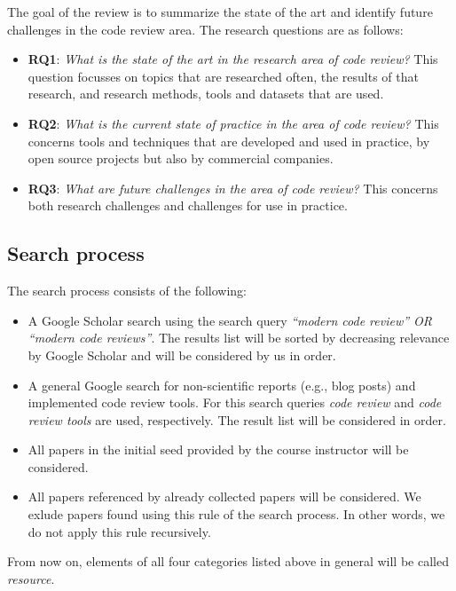 \documentclass[]{book}
\providecommand{\tightlist}{%
  \setlength{\itemsep}{0pt}\setlength{\parskip}{0pt}}
\begin{document}
The goal of the review is to summarize the state of the art and identify
future challenges in the code review area. The research questions are as
follows:

\begin{itemize}
\tightlist
\item
  \textbf{RQ1}: \emph{What is the state of the art in the research area
  of code review?} This question focusses on topics that are researched
  often, the results of that research, and research methods, tools and
  datasets that are used.
\item
  \textbf{RQ2}: \emph{What is the current state of practice in the area
  of code review?} This concerns tools and techniques that are developed
  and used in practice, by open source projects but also by commercial
  companies.
\item
  \textbf{RQ3}: \emph{What are future challenges in the area of code
  review?} This concerns both research challenges and challenges for use
  in practice.
\end{itemize}

\subsection{Search process}\label{search-process}

The search process consists of the following:

\begin{itemize}
\tightlist
\item
  A Google Scholar search using the search query \emph{``modern code
  review'' OR ``modern code reviews''}. The results list will be sorted
  by decreasing relevance by Google Scholar and will be considered by us
  in order.
\item
  A general Google search for non-scientific reports (e.g., blog posts)
  and implemented code review tools. For this search queries \emph{code
  review} and \emph{code review tools} are used, respectively. The
  result list will be considered in order.
\item
  All papers in the initial seed provided by the course instructor will
  be considered.
\item
  All papers referenced by already collected papers will be considered.
  We exlude papers found using this rule of the search process. In other
  words, we do not apply this rule recursively.
\end{itemize}

From now on, elements of all four categories listed above in general
will be called \emph{resource}.
\end{document}
